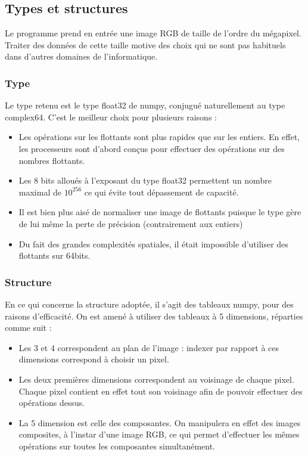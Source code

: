 \documentclass{article}
\begin{document}
\begin{multicols}{2}
\subsection{Types et structures}

Le programme prend en entrée une image RGB de taille de l'ordre du mégapixel. Traiter des données de cette taille motive des choix qui ne sont pas habituels dans d'autres domaines de l'informatique.

\subsubsection{Type}

Le type retenu est le type float32 de numpy, conjugué naturellement au type complex64. C'est le meilleur choix pour plusieurs raisons :
\begin{itemize}
	\item Les opérations sur les flottants sont plus rapides que sur les entiers. En effet, les processeurs sont d'abord conçus pour effectuer des opérations sur des nombres flottants.
	\item Les 8 bits alloués à l'exposant du type float32 permettent un nombre maximal de $10^{256}$ ce qui évite tout dépassement de capacité.
	\item Il est bien plus aisé de normaliser une image de flottants puisque le type gère de lui même la perte de précision (contrairement aux entiers)
	\item Du fait des grandes complexités spatiales, il était impossible d'utiliser des flottants sur 64bits.
\end{itemize}

\subsubsection{Structure}

En ce qui concerne la structure adoptée, il s'agit des tableaux numpy, pour des raisons d'efficacité. On est amené à utiliser des tableaux à 5 dimensions, réparties comme suit :
\begin{itemize}
	\item Les 3 et 4 correspondent au plan de l'image : indexer par rapport à ces dimensions correspond à choisir un pixel.
	\item Les deux premières dimensions correspondent au voisinage de chaque pixel. Chaque pixel contient en effet tout son voisinage afin de pouvoir effectuer des opérations dessus.
	\item La 5 dimension est celle des composantes. On manipulera en effet des images composites, à l'instar d'une image RGB, ce qui permet d'effectuer les mêmes opérations sur toutes les composantes simultanément.
\end{itemize}


\end{multicols}
\end{document}
